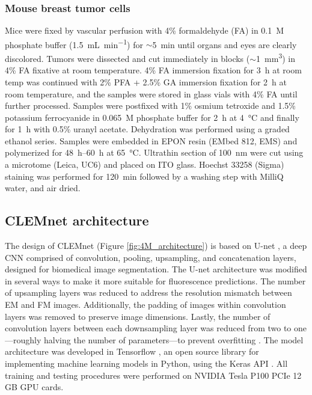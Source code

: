 \subsubsection{Mouse breast tumor cells}
\label{sec:4methods_prep_mbtc}
Mice were fixed by vascular perfusion with 4\% formaldehyde (FA) in \SI{0.1}{M} phosphate buffer (\SI{1.5}{\milli\liter\per\minute}) for ${\sim}$\SI{5}{\minute} until organs and eyes are clearly discolored. Tumors were dissected and cut immediately in blocks (${\sim}$\SI{1}{\milli\meter^3}) in 4\% FA fixative at room temperature. 4\% FA immersion fixation for \SI{3}{\hour} at room temp was continued with 2\% PFA + 2.5\% GA immersion fixation for \SI{2}{\hour} at room temperature, and the samples were stored in glass vials with 4\% FA until further processed. Samples were postfixed with 1\% osmium tetroxide and 1.5\% potassium ferrocyanide in \SI{0.065}{M} phosphate buffer for \SI{2}{\hour} at \SI{4}{\celsius} and finally for \SI{1}{\hour} with 0.5\% uranyl acetate. Dehydration was performed using a graded ethanol series. Samples were embedded in EPON resin (EMbed 812, EMS) and polymerized for \SIrange{48}{60}{\hour} at \SI{65}{\celsius}. Ultrathin section of \SI{100}{\nano\meter} were cut using a microtome (Leica, UC6) and placed on ITO glass. Hoechst 33258 (Sigma) staining was performed for \SI{120}{\minute} followed by a washing step with MilliQ water, and air dried.


\subsection{CLEMnet architecture}
\label{sec:4methods_architecture}

The design of CLEMnet (Figure \ref{fig:4M_architecture}) is based on U-net \cite{ronneberger2015u}, a deep CNN comprised of convolution, pooling, upsampling, and concatenation layers, designed for biomedical image segmentation. The U-net architecture was modified in several ways to make it more suitable for fluorescence predictions. The number of upsampling layers was reduced to address the resolution mismatch between EM and FM images. Additionally, the padding of images within convolution layers was removed to preserve image dimensions. Lastly, the number of convolution layers between each downsampling layer was reduced from two to one---roughly halving the number of parameters---to prevent overfitting \cite{balkenende2020clemnet}. The model architecture was developed in Tensorflow \cite{tensorflow2015-whitepaper}, an open source library for implementing machine learning models in Python, using the Keras API \cite{chollet2015keras}. All training and testing procedures were performed on NVIDIA Tesla P100 PCIe 12 GB GPU cards.

